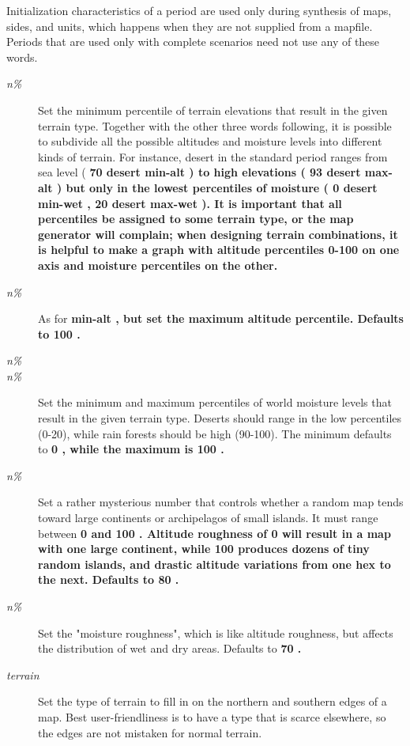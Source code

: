 Initialization characteristics of a period are used only during synthesis
of maps, sides, and units,
which happens when they are not supplied from a mapfile.
Periods that are used only with complete scenarios
need not use any of these words.
\begin{description}
\item[{%
\it n\%}]
Set the minimum percentile of terrain elevations that result in the given
terrain type.  Together with the other three words following, it is possible
to subdivide all the possible altitudes and moisture levels into different
kinds of terrain.  For instance, desert in the standard period ranges from
sea level (%
\bf 70 desert min-alt\rm%
)
to high elevations (%
\bf 93 desert max-alt\rm%
) but only
in the lowest percentiles of moisture (%
\bf 0 desert min-wet\rm%
,
%
\bf 20 desert max-wet\rm%
).  It is important that all percentiles be assigned
to some terrain type, or the map generator will complain; when designing
terrain combinations, it is helpful to make a graph with altitude percentiles
0-100 on one axis and moisture percentiles on the other.
\item[{%
\it n\%}]
As for %
\bf min-alt\rm%
, but set the maximum altitude percentile.
Defaults to %
\bf 100\rm%
.
\item[{%
\it n\%}]
\item[{%
\it n\%}]
Set the minimum and maximum percentiles
of world moisture levels that result in the given
terrain type.  Deserts should range in the low percentiles (0-20), while
rain forests should be high (90-100).
The minimum defaults to %
\bf 0\rm%
, while the maximum is %
\bf 100\rm%
.
\item[{%
\it n\%}]
Set a rather mysterious number that controls whether a random map tends
toward large continents or archipelagos of small islands.  It must range
between %
\bf 0 \rm%
and %
\bf 100\rm%
.  Altitude roughness of %
\bf 0 \rm%
will result
in a map with one large continent, while %
\bf 100 \rm%
produces dozens of tiny
random islands, and drastic altitude variations from one hex to the next.
Defaults to %
\bf 80\rm%
.
\item[{%
\it n\%}]
Set the "moisture roughness", which is like altitude roughness, but affects
the distribution of wet and dry areas.  Defaults to %
\bf 70\rm%
.
\item[{%
\it terrain}]
Set the type of terrain to fill in on the northern and southern edges of
a map.  Best user-friendliness is to have a type that is scarce elsewhere,
so the edges are not mistaken for normal terrain.

\end{description}
